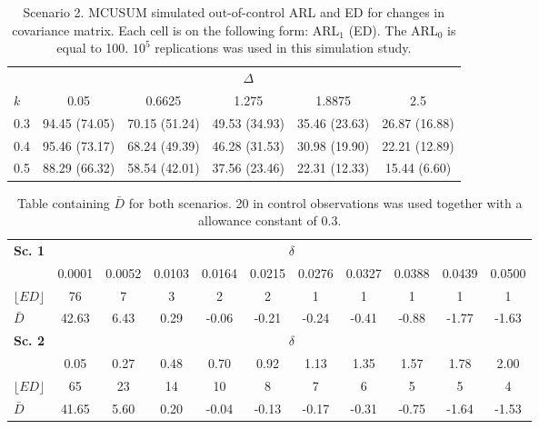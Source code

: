 \documentclass[a4paper,11pt,fleqn,twoside,notitlepage]{report}\usepackage[]{graphicx}\usepackage[]{color}
\begin{document}
\begin{table}[ht]
\centering
\caption{Scenario 2. MCUSUM simulated out-of-control ARL and ED for changes in covariance matrix. Each cell is on the following form: ARL$_1$ (ED). The ARL$_0$ is equal to 100. $10^5$ replications was used in this simulation study.\label{LongTable2}}
\begin{tabular}{lccccc}
\toprule
& \multicolumn{5}{c}{$\Delta$} \\ \cmidrule(r){2-6}
$k$ & 0.05 & 0.6625 & 1.275 & 1.8875 & 2.5 \\[0.1cm] 
\midrule
 0.3 & 94.45 (74.05) & 70.15 (51.24) & 49.53 (34.93) & 35.46 (23.63) & 26.87 (16.88) \\[0.2cm]
\midrule
  0.4 & 95.46 (73.17) & 68.24 (49.39) & 46.28 (31.53) & 30.98 (19.90) & 22.21 (12.89) \\[0.2cm] 
\midrule
 0.5 & 88.29 (66.32) & 58.54 (42.01) & 37.56 (23.46) & 22.31 (12.33) & 15.44 (6.60) \\[0.2cm] 
\bottomrule
\end{tabular}
\end{table}

\begin{table}[ht]
\centering
\caption{Table containing $\bar{D}$ for both scenarios. 20 in control observations was used together with a allowance constant of $0.3$.\label{OffsetTable}}
\begin{tabular}{lcccccccccc}
\toprule
\textbf{Sc. 1} & \multicolumn{10}{c}{$\delta$} \\ \cmidrule(r){2-11} 
 & 0.0001 & 0.0052 & 0.0103 & 0.0164 & 0.0215 & 0.0276 & 0.0327 & 0.0388 & 0.0439 & 0.0500 \\ 
 $\lfloor ED \rfloor$ & 76 & 7 & 3 & 2 & 2 & 1 & 1 & 1 & 1 & 1 \\
 $\bar{D}$ & 42.63 & 6.43 & 0.29 & -0.06 & -0.21 & -0.24 & -0.41 & -0.88 & -1.77 & -1.63 \\[0.1cm]
\midrule
\textbf{Sc. 2} & \multicolumn{10}{c}{$\delta$} \\ \cmidrule(r){2-11} 
 & 0.05 & 0.27 & 0.48 & 0.70 & 0.92 & 1.13 & 1.35 & 1.57 & 1.78 & 2.00 \\
 $\lfloor ED \rfloor$ & 65 & 23 & 14 & 10 &  8 &  7  & 6  & 5 & 5 & 4 \\
$\bar{D}$ & 41.65 & 5.60 & 0.20 & -0.04 & -0.13 & -0.17 & -0.31 & -0.75 & -1.64 & -1.53 \\
\bottomrule
\end{tabular}
\end{table}
\end{document}
